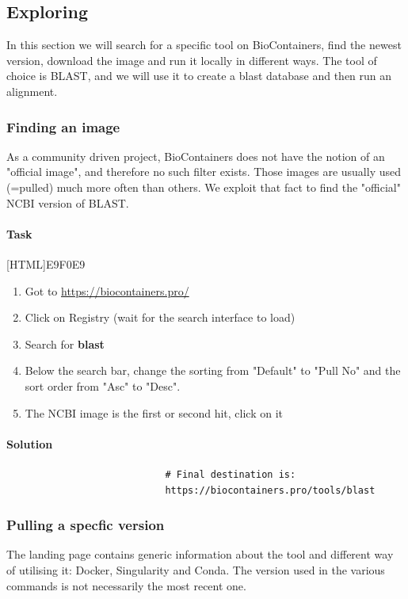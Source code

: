 \documentclass[12pt]{article}
\begin{document}
		
		\subsection{Exploring}
			In this section we will search for a specific tool on BioContainers, find the newest version, download the image and run it locally in different ways. 
			The tool of choice is BLAST, and we will use it to create a blast database and then run an alignment. 
			
			\subsubsection{Finding an image} 
				As a community driven project, BioContainers does not have the notion of an "official image", and therefore no such filter exists.
				Those images are usually used (=pulled) much more often than others.
				We exploit that fact to find the "official" NCBI version of BLAST.

				\paragraph{Task}
					[HTML]{E9F0E9}{\parbox{\linewidth}{%
							\begin{enumerate}
								\item Got to \url{https://biocontainers.pro/}
								\item Click on Registry (wait for the search interface to load)
								\item Search for \textbf{blast}
								\item Below the search bar, change the sorting from "Default" to "Pull No" and the sort order from "Asc" to "Desc".
								\item The NCBI image is the first or second hit, click on it
							\end{enumerate}
					}}
				
				\paragraph{Solution}
					\begin{minipage}{\linewidth}
						\begin{lstlisting}
							# Final destination is:
							https://biocontainers.pro/tools/blast
						\end{lstlisting}
					\end{minipage}
		
			\subsubsection{Pulling a specfic version}
				The landing page contains generic information about the tool and different way of utilising it: Docker, Singularity and Conda.
				The version used in the various commands is not necessarily the most recent one.
				
\end{document}
